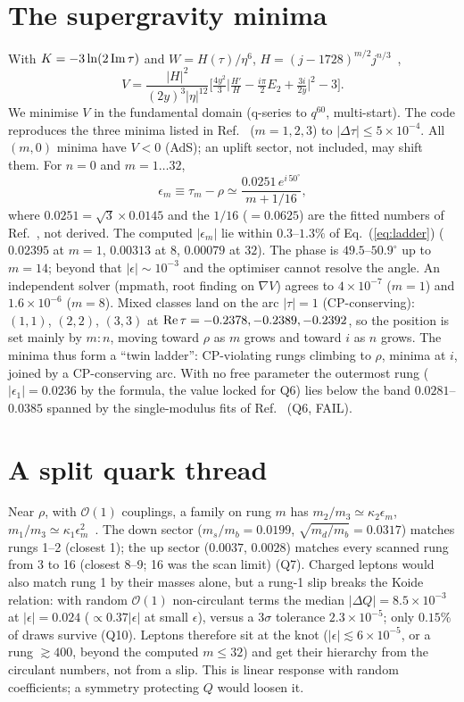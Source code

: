 \documentclass[aps,prd,twocolumn,superscriptaddress,nofootinbib,showkeys]{revtex4-2}
\begin{document}
\section{The supergravity minima}
With $K=-3\ln(2\,{\rm Im}\,\tau)$ and $W=H(\tau)/\eta^6$, $H=(j-1728)^{m/2}j^{n/3}$~\cite{NPP},
\begin{equation}
V=\frac{|H|^2}{(2y)^3|\eta|^{12}}\Big[\tfrac{4y^2}{3}\Big|\tfrac{H'}{H}-\tfrac{i\pi}{2}E_2+\tfrac{3i}{2y}\Big|^2-3\Big].
\end{equation}
We minimise $V$ in the fundamental domain (q-series to $q^{60}$, multi-start). The code reproduces the three minima listed in Ref.~\cite{NPP} ($m=1,2,3$) to $|\Delta\tau|\le5\times10^{-4}$. All $(m,0)$ minima have $V<0$ (AdS); an uplift sector, not included, may shift them. For $n=0$ and $m=1\ldots32$,
\begin{equation}
\epsilon_m\equiv\tau_m-\rho\simeq\frac{0.0251\,e^{i\,50^\circ}}{m+1/16},
\label{eq:ladder}
\end{equation}
where $0.0251=\sqrt3\times0.0145$ and the $1/16$ ($=0.0625$) are the fitted numbers of Ref.~\cite{NPP}, not derived. The computed $|\epsilon_m|$ lie within $0.3$--$1.3\%$ of Eq.~(\ref{eq:ladder}) ($0.02395$ at $m=1$, $0.00313$ at $8$, $0.00079$ at $32$). The phase is $49.5$--$50.9^\circ$ up to $m=14$; beyond that $|\epsilon|\sim10^{-3}$ and the optimiser cannot resolve the angle. An independent solver (mpmath, root finding on $\nabla V$) agrees to $4\times10^{-7}$ ($m=1$) and $1.6\times10^{-6}$ ($m=8$). Mixed classes land on the arc $|\tau|=1$ (CP-conserving): $(1,1)$, $(2,2)$, $(3,3)$ at ${\rm Re}\,\tau=-0.2378,-0.2389,-0.2392$, so the position is set mainly by $m{:}n$, moving toward $\rho$ as $m$ grows and toward $i$ as $n$ grows. The minima thus form a ``twin ladder'': CP-violating rungs climbing to $\rho$, minima at $i$, joined by a CP-conserving arc. With no free parameter the outermost rung ($|\epsilon_1|=0.0236$ by the formula, the value locked for Q6) lies below the band $0.0281$--$0.0385$ spanned by the single-modulus fits of Ref.~\cite{PT} (Q6, FAIL).

\section{A split quark thread}
Near $\rho$, with $\mathcal O(1)$ couplings, a family on rung $m$ has $m_2/m_3\simeq\kappa_2\epsilon_m$, $m_1/m_3\simeq\kappa_1\epsilon_m^2$~\cite{PT}. The down sector ($m_s/m_b=0.0199$, $\sqrt{m_d/m_b}=0.0317$) matches rungs 1--2 (closest 1); the up sector ($0.0037$, $0.0028$) matches every scanned rung from 3 to 16 (closest 8--9; 16 was the scan limit) (Q7). Charged leptons would also match rung 1 by their masses alone, but a rung-1 slip breaks the Koide relation: with random $\mathcal O(1)$ non-circulant terms the median $|\Delta Q|=8.5\times10^{-3}$ at $|\epsilon|=0.024$ ($\propto0.37|\epsilon|$ at small $\epsilon$), versus a 3$\sigma$ tolerance $2.3\times10^{-5}$; only $0.15\%$ of draws survive (Q10). Leptons therefore sit at the knot ($|\epsilon|\lesssim6\times10^{-5}$, or a rung $\gtrsim400$, beyond the computed $m\le32$) and get their hierarchy from the circulant numbers, not from a slip. This is linear response with random coefficients; a symmetry protecting $Q$ would loosen it.
\end{document}
